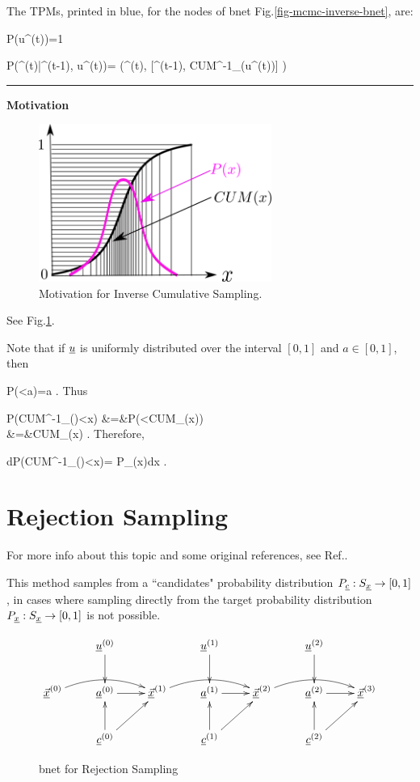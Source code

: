 The TPMs, printed
in blue, for  the nodes of bnet
 Fig.\ref{fig-mcmc-inverse-bnet}, are:

\beq\color{blue}
P(u^{(t)})=1
\eeq

\beq\color{blue}
P(\vecx^{(t)}|\vecx^{(t-1)}, u^{(t)})=
\delta(\;\;\;\vecx^{(t)},
[\vecx^{(t-1)}, CUM^{-1}_\rvx(u^{(t)})]
\;\;\;)
\eeq

\hrule\noindent
{\bf Motivation}

\begin{figure}[h!]
\centering
\includegraphics[width=3in]
{mcmc/inverse.png}
\caption{Motivation 
for Inverse Cumulative Sampling.} 
\label{fig-mcmc-inverse}
\end{figure}
See Fig.\ref{fig-mcmc-inverse}.


Note that if 
${\underline{u}}$ is uniformly distributed over 
the interval $[0,1]$ and $a\in[0,1]$, then

\beq
P(\rvu<a)=a
\;.
\eeq
Thus

\beqa
P(CUM^{-1}_\rvx(\rvu)<x)
&=&P(\rvu<CUM_\rvx(x))
\\
&=&CUM_\rvx(x)
\;.
\eeqa
Therefore,

\beq
dP(CUM^{-1}_\rvx(\rvu)<x)=
P_\rvx(x)dx
\;.
\eeq


\section*{Rejection Sampling}

For more info about this topic 
and some original references, 
see Ref.\cite{wiki-reject}.

This method samples
from a ``candidates" probability distribution
$P_{\underline{c}}:S_{\underline{x}}\rightarrow [0,1]$,
in cases where sampling directly
from the
target probability distribution
$P_{\underline{x}}:S_{\underline{x}}\rightarrow [0,1]$
is not possible.


\begin{figure}[h!]
$$\xymatrix{
&\rvu^{(0)}\ar[d]
&&\rvu^{(1)}\ar[d]
&&\rvu^{(2)}\ar[d]
\\
\ul{\vecx}^{(0)}\ar@/^1pc/[rr]
&\rva^{(0)}\ar[r]
&
\ul{\vecx}^{(1)}\ar@/^1pc/[rr]
&\rva^{(1)}\ar[r]
&
\ul{\vecx}^{(2)}\ar@/^1pc/[rr]
&\rva^{(2)}\ar[r]
&\ul{\vecx}^{(3)}
\\
&\rvc^{(0)}\ar[u]\ar[ru]
&&\rvc^{(1)}\ar[u]\ar[ru]
&&\rvc^{(2)}\ar[u]\ar[ru]
}$$
\caption{bnet for Rejection Sampling}
\label{fig-mcmc-reject-bnet}
\end{figure}

